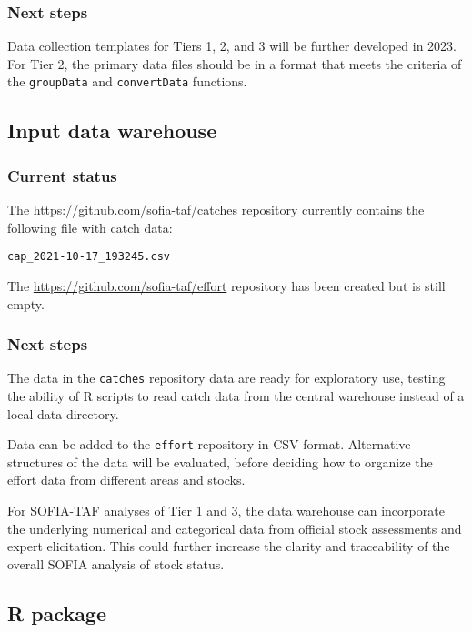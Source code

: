\documentclass[12pt]{article}
\newcommand\blue[1]{\textcolor{darkblue}{#1}}
\begin{document}
\subsubsection{Next steps}

Data collection templates for Tiers 1, 2, and 3 will be further developed in
2023. For Tier 2, the primary data files should be in a format that meets the
criteria of the {\tt groupData} and {\tt convertData} functions.

\subsection{Input data warehouse}

\subsubsection{Current status}

The \blue{\url{https://github.com/sofia-taf/catches}} repository currently
contains the following file with catch data:

\begin{verbatim}
cap_2021-10-17_193245.csv
\end{verbatim}

The \blue{\url{https://github.com/sofia-taf/effort}} repository has been created
but is still empty.

\subsubsection{Next steps}

The data in the \verb|catches| repository data are ready for exploratory use,
testing the ability of R scripts to read catch data from the central warehouse
instead of a local data directory.

Data can be added to the \verb|effort| repository in CSV format. Alternative
structures of the data will be evaluated, before deciding how to organize the
effort data from different areas and stocks.

For SOFIA-TAF analyses of Tier 1 and 3, the data warehouse can incorporate the
underlying numerical and categorical data from official stock assessments and
expert elicitation. This could further increase the clarity and traceability of
the overall SOFIA analysis of stock status.

\subsection{R package}
\end{document}
